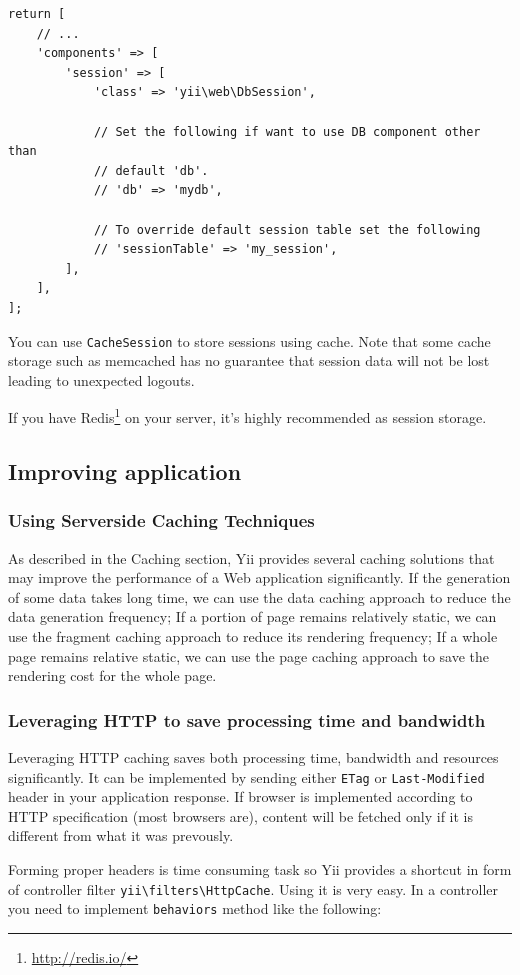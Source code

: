 \lstset{language=php}\begin{lstlisting}
return [
    // ...
    'components' => [
        'session' => [
            'class' => 'yii\web\DbSession',

            // Set the following if want to use DB component other than
            // default 'db'.
            // 'db' => 'mydb',

            // To override default session table set the following
            // 'sessionTable' => 'my_session',
        ],
    ],
];
\end{lstlisting}
You can use \lstinline|CacheSession| to store sessions using cache. Note that some
cache storage such as memcached has no guarantee that session data will not
be lost leading to unexpected logouts.

If you have Redis\footnote{\url{http://redis.io/}} on your server, it's highly recommended as session storage.

\subsection{Improving application}
\subsubsection{Using Serverside Caching Techniques}
As described in the Caching section, Yii provides several caching solutions that
may improve the performance of a Web application significantly. If the generation
of some data takes long time, we can use the data caching approach to reduce the
data generation frequency; If a portion of page remains relatively static, we
can use the fragment caching approach to reduce its rendering frequency;
If a whole page remains relative static, we can use the page caching approach to
save the rendering cost for the whole page.

\subsubsection{Leveraging HTTP to save processing time and bandwidth}
Leveraging HTTP caching saves both processing time, bandwidth and resources significantly. It can be implemented by
sending either \lstinline|ETag| or \lstinline|Last-Modified| header in your application response. If browser is implemented according to
HTTP specification (most browsers are), content will be fetched only if it is different from what it was prevously.

Forming proper headers is time consuming task so Yii provides a shortcut in form of controller filter
\texttt{yii{\allowbreak{}\textbackslash}filters{\allowbreak{}\textbackslash}HttpCache}. Using it is very easy. In a controller you need to implement \lstinline|behaviors| method like
the following:

